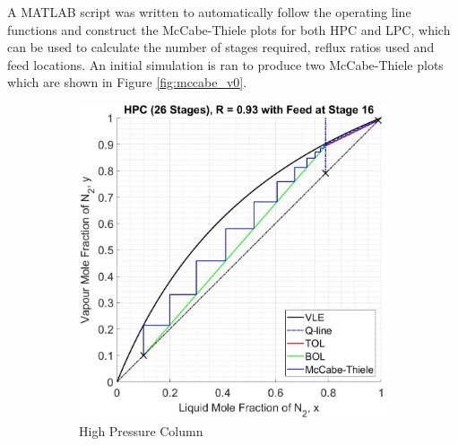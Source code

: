         \noindent A MATLAB script was written to automatically follow the operating line functions and construct the McCabe-Thiele plots for both HPC and LPC, which can be used to calculate the number of stages required, reflux ratios used and feed locations. An initial simulation is ran to produce two McCabe-Thiele plots which are shown in Figure \ref{fig:mccabe_v0}.\\
        \begin{figure}[H]
            \begin{subfigure}{0.49\textwidth}
                \includegraphics[width=\linewidth]{airseparation/graphics/HPC_v0.jpg}
                \caption{High Pressure Column}
                \label{fig:HPC_v0}
            \end{subfigure}
            \hspace*{\fill} %
            \begin{subfigure}{0.49\textwidth}

\end{subfigure}
\end{figure}
